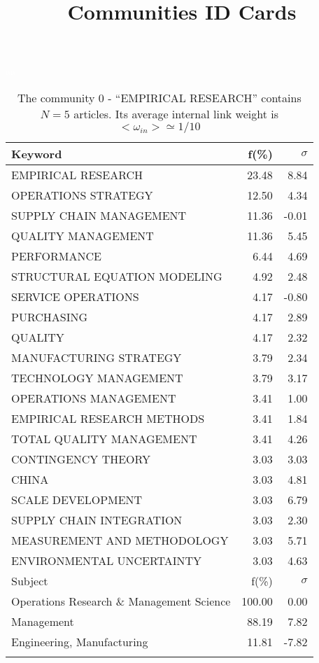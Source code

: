 \documentclass[a4paper,11pt]{report}
\title{{\bf Communities ID Cards}}
\date{\begin{flushleft}This document gather the ``ID Cards'' of the CC communities found within your database.\\
 The CC network was built by keeping a link between articles sharing at least 10 references. The communities characterized here correspond to the ones found in the level 1 (in the sense of the Louvain algo) which gathers more than 0 articles.\\
 These ID cards displays the most frequent keywords, subject categories, journals of publication, institution, countries, authors, references and reference journals of the articles of each community. The significance of an item $\sigma = \sqrt{N} (f - p) / \sqrt{p(1-p)}$ [where $N$ is the number of articles within the community and $f$ and $p$ are the proportion of articles respectively within the community and within the database displaying that item ] is also given (for example $\sigma > 5$ is really highly significant).\\
\vspace{1cm}
\copyright Sebastian Grauwin, Liu Weizhi - (2014) \end{flushleft}}
\begin{document}
\begin{landscape}
\maketitle
\clearpage

\begin{table}[!ht]
\caption{The community 0 - ``EMPIRICAL RESEARCH'' contains $N = 5$ articles. Its average internal link weight is $<\omega_{in}> \simeq 1/10$ }
\textcolor{white}{aa}\\
{\scriptsize\begin{tabular}{|l r r|}
\hline
Keyword & f(\%) & $\sigma$\\
\hline
EMPIRICAL RESEARCH & 23.48 & 8.84\\
OPERATIONS STRATEGY & 12.50 & 4.34\\
SUPPLY CHAIN MANAGEMENT & 11.36 & -0.01\\
QUALITY MANAGEMENT & 11.36 & 5.45\\
PERFORMANCE & 6.44 & 4.69\\
STRUCTURAL EQUATION MODELING & 4.92 & 2.48\\
SERVICE OPERATIONS & 4.17 & -0.80\\
PURCHASING & 4.17 & 2.89\\
QUALITY & 4.17 & 2.32\\
MANUFACTURING STRATEGY & 3.79 & 2.34\\
TECHNOLOGY MANAGEMENT & 3.79 & 3.17\\
OPERATIONS MANAGEMENT & 3.41 & 1.00\\
EMPIRICAL RESEARCH METHODS & 3.41 & 1.84\\
TOTAL QUALITY MANAGEMENT & 3.41 & 4.26\\
CONTINGENCY THEORY & 3.03 & 3.03\\
CHINA & 3.03 & 4.81\\
SCALE DEVELOPMENT & 3.03 & 6.79\\
SUPPLY CHAIN INTEGRATION & 3.03 & 2.30\\
MEASUREMENT AND METHODOLOGY & 3.03 & 5.71\\
ENVIRONMENTAL UNCERTAINTY & 3.03 & 4.63\\
\hline
\hline
Subject & f(\%) & $\sigma$\\
\hline
Operations Research \& Management Science & 100.00 & 0.00\\
Management & 88.19 & 7.82\\
Engineering, Manufacturing & 11.81 & -7.82\\
 &  & \\

\end{tabular}}
\end{table}
\end{landscape}
\end{document}
